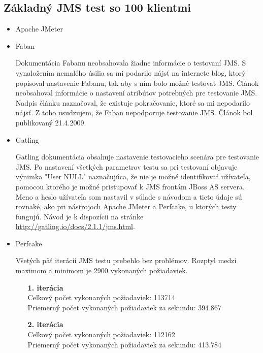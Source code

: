 \documentclass[12pt,oneside,final]{fithesis-utf8}
\begin{document}
\subsection{Základný JMS test so 100 klientmi}

\begin{itemize}

\item Apache JMeter

\item Faban

Dokumentácia Fabanu neobsahovala žiadne informácie o testovaní JMS. S vynaložením nemalého úsilia sa mi podarilo nájsť na internete blog, ktorý popisoval nastavenie Fabanu, tak aby s ním bolo možné testovať JMS. Článok neobsahoval informácie o nastavení atribútov potrebných pre testovanie JMS. Nadpis článku naznačoval, že existuje pokračovanie, ktoré sa mi nepodarilo nájsť. Z toho usudzujem, že Faban nepodporuje testovanie JMS. Článok bol publikovaný 21.4.2009\cite{FabanBlog}.

\item Gatling

Gatling dokumentácia obsahuje nastavenie testovacieho scenára pre testovanie JMS. Po nastavení všetkých parametrov testu sa pri testovaní objavuje výnimka "{}User NULL"{} naznačujúca, že nie je možné identifikovať užívateľa, pomocou ktorého je možné pristupovať k JMS frontám JBoss AS servera. Meno a heslo užívateľa som nastavil v súlade s návodom a tieto údaje sú rovnaké, ako pri nástrojoch Apache JMeter a Perfcake, u ktorých testy fungujú. Návod je k dispozícii na stránke \url{http://gatling.io/docs/2.1.1/jms.html}.

\item Perfcake

Všetých päť iterácií JMS testu prebehlo bez problémov. Rozptyl medzi maximom a minimom je 2900 vykonaných požiadaviek.

\begin{itemize}

\item[\textbf{1. iterácia}]\ \\
Celkový počet vykonaných požiadaviek: 113714\\
Priemerný počet vykonaných požiadaviek za sekundu: 394.867

\item[\textbf{2. iterácia}]\ \\
Celkový počet vykonaných požiadaviek: 112162\\
Priemerný počet vykonaných požiadaviek za sekundu: 413.784


\end{itemize}
\end{itemize}
\end{document}
